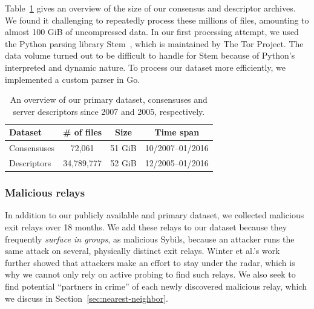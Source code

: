 Table~\ref{tab:collector-dataset} gives an overview of the size of our consensus
and descriptor archives.  We found it challenging to repeatedly process these
millions of files, amounting to almost 100 GiB of uncompressed data.  In our
first processing attempt, we used the Python parsing library Stem~\cite{stem},
which is maintained by The Tor Project.  The data volume turned out to be
difficult to handle for Stem because of Python's interpreted and dynamic nature.
To process our dataset more efficiently, we implemented a custom parser in Go.

\begin{table}[t]
\small
\centering
\begin{tabular}{l c c c}
\textbf{Dataset} & \textbf{\# of files} & \textbf{Size} & \textbf{Time span} \\
\hline
Consensuses & 72,061 & 51 GiB & 10/2007--01/2016 \\
Descriptors & 34,789,777 & 52 GiB & 12/2005--01/2016 \\
\end{tabular}
\caption{An overview of our primary dataset, consensuses and server descriptors
since 2007 and 2005, respectively.}
\label{tab:collector-dataset}
\end{table}

\subsubsection{Malicious relays}
In addition to our publicly available and primary dataset, we collected
malicious exit relays over 18 months.  We add these relays to our dataset
because they frequently \emph{surface in groups}, as malicious Sybils, because
an attacker runs the same attack on several, physically distinct exit
relays.  Winter et al.'s work~\cite[\S 5.2]{Winter2014a} further showed that
attackers make an effort to stay under the radar, which is why we cannot only
rely on active probing to find such relays.  We also seek to find potential
``partners in crime'' of each newly discovered malicious relay, which we discuss
in Section~\ref{sec:nearest-neighbor}.

